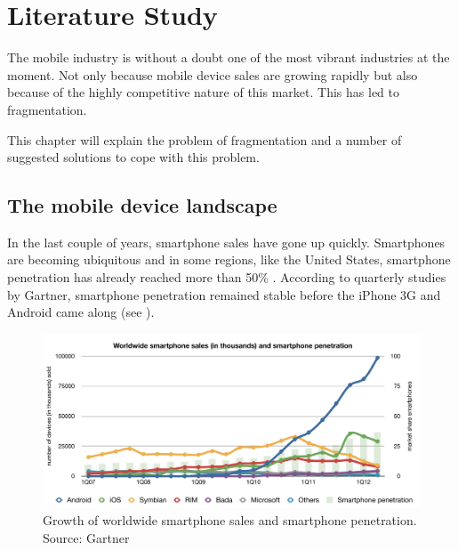 \chapter{Literature Study}
\label{chap:literature}

\npar The mobile industry is without a doubt one of the most vibrant industries at the moment. Not only because mobile device sales are growing rapidly but also because of the highly competitive nature of this market. This has led to fragmentation. 

\npar This chapter will explain the problem of fragmentation and a number of suggested solutions to cope with this problem.

\section{The mobile device landscape}

\npar In the last couple of years, smartphone sales have gone up quickly. Smartphones are becoming ubiquitous and in some regions, like the United States, smartphone penetration has already reached more than 50\% \cite{Nielsen:2012}. According to quarterly studies by Gartner, smartphone penetration remained stable before the iPhone 3G and Android came along (see ).

\begin{figure}
    \begin{center}
        \includegraphics[width=\textwidth]{figs/smartphone_sales.pdf}
        	\caption{
        	    	Growth of worldwide smartphone sales and smartphone penetration. Source: Gartner \citep{Gartner:08Q2,Gartner:08Q3,Gartner:08Q4,Gartner:10Q1,Gartner:10Q2,Gartner:10Q3,Gartner:10Q4,Gartner:11Q1,Gartner:11Q2,Gartner:11Q3,Gartner:11Q4,Gartner:12Q1,Gartner:12Q2}
        	}
        	\label{fig:smartphone_sales}
    \end{center}
\end{figure}

